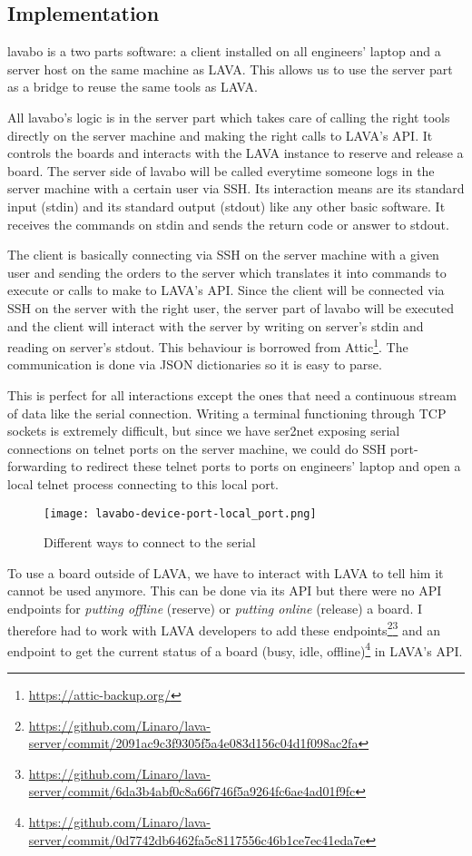 \subsection{Implementation}

lavabo is a two parts software: a client installed on all engineers' laptop and a server host on the same machine as LAVA. This allows us to use the server part as a bridge to reuse the same tools as LAVA.

All lavabo's logic is in the server part which takes care of calling the right tools directly on the server machine and making the right calls to LAVA's API. It controls the boards and interacts with the LAVA instance to reserve and release a board. The server side of lavabo will be called everytime someone logs in the server machine with a certain user via SSH. Its interaction means are its standard input (stdin) and its standard output (stdout) like any other basic software. It receives the commands on stdin and sends the return code or answer to stdout.

The client is basically connecting via SSH on the server machine with a given user and sending the orders to the server which translates it into commands to execute or calls to make to LAVA's API. Since the client will be connected via SSH on the server with the right user, the server part of lavabo will be executed and the client will interact with the server by writing on server's stdin and reading on server's stdout. This behaviour is borrowed from Attic\footnote{\url{https://attic-backup.org/}}. The communication is done via JSON dictionaries so it is easy to parse.

This is perfect for all interactions except the ones that need a continuous stream of data like the serial connection. Writing a terminal functioning through TCP sockets is extremely difficult, but since we have ser2net exposing serial connections on telnet ports on the server machine, we could do SSH port-forwarding to redirect these telnet ports to ports on engineers' laptop and open a local telnet process connecting to this local port.

\begin{figure}[H]
  \texttt{[image: lavabo-device-port-local\_port.png]}
  \caption{Different ways to connect to the serial}
\end{figure}

To use a board outside of LAVA, we have to interact with LAVA to tell him it cannot be used anymore. This can be done via its API but there were no API endpoints for \textit{putting offline} (reserve) or \textit{putting online} (release) a board. I therefore had to work with LAVA developers to add these endpoints\footnote{\url{https://github.com/Linaro/lava-server/commit/2091ac9c3f9305f5a4e083d156c04d1f098ac2fa}}\footnote{\url{https://github.com/Linaro/lava-server/commit/6da3b4abf0c8a66f746f5a9264fc6ae4ad01f9fc}} and an endpoint to get the current status of a board (busy, idle, offline)\footnote{\url{https://github.com/Linaro/lava-server/commit/0d7742db6462fa5c8117556c46b1ce7ec41eda7e}} in LAVA's API.

